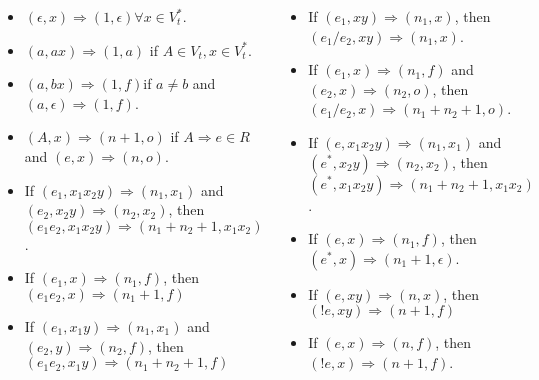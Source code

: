 \begin{frame}
	\scriptsize
	\begin{columns}
		\begin{itemize}
		\item $(\epsilon, x) \Rightarrow  (1,\epsilon) \forall x \in V_t^*$.
		
		\item $(a,ax) \Rightarrow (1, a)$ if $A \in V_t,x \in V_t^*$.
		
		\item  $(a,bx) \Rightarrow (1, f) $if $ a \neq b$ and $(a, \epsilon) \Rightarrow (1,f)$.
		
		\item  $(A,x) \Rightarrow (n+1,o)$ if $A \Rightarrow e \in R$ and $(e,x) \Rightarrow (n,o)$.
		
		\item If $(e_1,x_1x_2y) \Rightarrow (n_1, x_1)$ and $(e_2,x_2y) \Rightarrow (n_2,x_2)$, then 
	$(e_1e_2,x_1x_2y) \Rightarrow (n_1+n_2+1,x_1x_2)$.
		
		\item If $(e_1, x) \Rightarrow (n_1, f)$, then $(e_1e_2,x) \Rightarrow (n_1+1,f)$
		
		\item If $(e_1,x_1y) \Rightarrow (n_1, x_1)$ and $(e_2, y) \Rightarrow (n_2, f)$, then $(e_1e_2, x_1y) \Rightarrow (n_1 + n_2 + 1, f)$
		\end{itemize}
	
	\begin{itemize}
			
		
		\item If $(e_1,xy) \Rightarrow (n_1,x)$, then $(e_1 / e_2, xy) \Rightarrow (n_1,x)$.
		
		\item If $(e_1,x) \Rightarrow (n_1,f)$ and $(e_2,x) \Rightarrow (n_2,o)$, then $(e_1 / e_2, x) \Rightarrow (n_1 + n_2 +1,o)$.
		
		\item If $(e,x_1x_2y) \Rightarrow (n_1,x_1)$ and $(e^*,x_2y) \Rightarrow (n_2,x_2)$, then $(e^*,x_1x_2y) \Rightarrow (n_1 + n_2 + 1, x_1x_2)$.
		
		\item  If $(e, x) \Rightarrow (n_1, f)$, then  $(e^*, x) \Rightarrow (n_1 + 1, \epsilon)$.
		
		\item If $(e, xy) \Rightarrow (n, x)$, then $(!e, xy) \Rightarrow (n+1, f)$
		
		\item If $(e, x) \Rightarrow (n, f)$, then $(!e, x) \Rightarrow (n+1, f)$.
	\end{itemize}
	\end{columns}
\end{frame}

